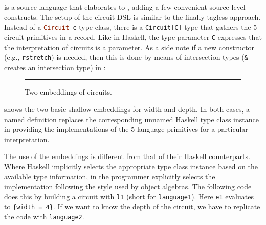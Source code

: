 \sedel is a source language that elaborates to \fnamee, adding
a few convenient source level constructs.
The \sedel setup of the circuit DSL is similar to the finally tagless
approach. Instead of a \lstinline[language=haskell]{Circuit c} type class, there is a \lstinline{Circuit[C]}
type that gathers the 5 circuit primitives in a record. Like in Haskell, the type
parameter \lstinline{C} expresses that the interpretation of circuits
is a parameter.
As a side note if a new constructor (e.g., \lstinline{rstretch}) is
needed, then this is done by means of
intersection types (\lstinline{&} creates an intersection type) in \sedel:


\begin{figure}[t]
\hrule
\caption{Two \sedel embeddings of circuits.}
\label{fig:sedel}
\end{figure}

 shows the two basic shallow embeddings for width and
depth. In both cases, a named \sedel definition
replaces the corresponding unnamed
Haskell type class instance in providing the implementations of the 5 language
primitives for a particular interpretation.


The use of the \sedel embeddings is different from that of their Haskell
counterparts. Where Haskell implicitly selects the appropriate type class
instance based on the available type information, in \sedel the programmer
explicitly selects the implementation following the style used by
object algebras.
The following code does this by
building a circuit with \lstinline{l1} (short for \lstinline{language1}).
Here \lstinline{e1} evaluates to \lstinline${width = 4}$. If we want to know the
depth of the circuit, we have to replicate the code with \lstinline{language2}.

